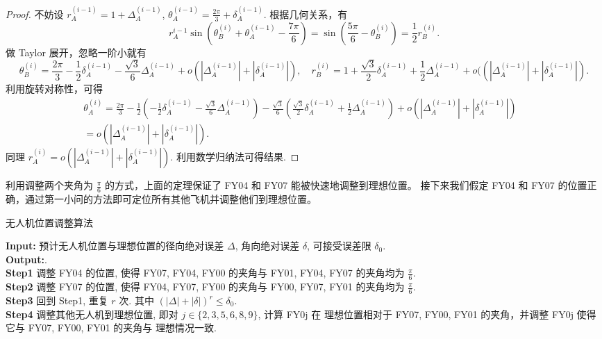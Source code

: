 \documentclass{my_paper}
\begin{document}
\begin{proof}
    不妨设 $r_A^{(i-1)}=1+\Delta_A^{(i-1)}$, $\theta_A^{(i-1)}=\frac{2\pi}{3}+\delta_A^{(i-1)}$. 根据几何关系，有 
    $$
    r_A^{i-1}\sin(\theta_B^{(i)}+\theta_A^{(i-1)}-\frac{7\pi}{6})=\sin(\frac{5\pi}{6}-\theta_{B}^{(i)})=\frac12 r_B^{(i)}.
    $$
    做 Taylor 展开，忽略一阶小就有
    $$
        \theta_{B}^{(i)}= \frac{2\pi}3-\frac{1}{2} \delta_A^{(i-1)}-\frac{\sqrt 3}6 \Delta_A^{(i-1)}+o(|\Delta_A^{(i-1)}|+|\delta_A^{(i-1)}|)
        ,\quad r_{B}^{(i)} = 1 +\frac{\sqrt3}{2} \delta_A^{(i-1)}+\frac12 \Delta_A^{(i-1)}+o((|\Delta_A^{(i-1)}|+|\delta_A^{(i-1)}|).
    $$
    利用旋转对称性，可得
    \begin{equation}
    \begin{aligned}
        \theta_{A}^{(i)}= \frac{2\pi}3-\frac{1}{2} (-\frac{1}{2} \delta_A^{(i-1)}-\frac{\sqrt 3}6 \Delta_A^{(i-1)})
        -\frac{\sqrt 3}6 (\frac{\sqrt3}{2} \delta_A^{(i-1)}+\frac12 \Delta_A^{(i-1)}) +o(|\Delta_A^{(i-1)}|+|\delta_A^{(i-1)}|)
        \\=o(|\Delta_A^{(i-1)}|+|\delta_A^{(i-1)}|).&
    \end{aligned}
    \label{2}
    \end{equation}
    同理 $r_{A}^{(i)}=o(|\Delta_A^{(i-1)}|+|\delta_A^{(i-1)}|).$ 利用数学归纳法可得结果. 
\end{proof}

    利用调整两个夹角为 $\frac\pi6$ 的方式，上面的定理保证了 FY04 和 FY07 能被快速地调整到理想位置。
    接下来我们假定 FY04 和 FY07 的位置正确，通过第一小问的方法即可定位所有其他飞机并调整他们到理想位置。

\begin{algorithm}[t]
    \caption{\small 无人机位置调整算法}
    \textbf{Input:} 预计无人机位置与理想位置的径向绝对误差 $\Delta$, 角向绝对误差 $\delta$, 可接受误差限 $\delta_0$.\\
    \textbf{Output:}. \\
    \textbf{Step1} 调整 FY04 的位置, 使得 FY07, FY04, FY00 的夹角与 FY01, FY04, FY07 的夹角均为 $\frac{\pi}{6}$.\\
    \textbf{Step2} 调整 FY07 的位置, 使得 FY04, FY07, FY00 的夹角与 FY00, FY07, FY01 的夹角均为 $\frac{\pi}{6}$.\\
    \textbf{Step3} 回到 Step1, 重复 $r$ 次. 其中 $(|\Delta|+|\delta|)^r\leq\delta_0$. \\
    \textbf{Step4} 调整其他无人机到理想位置, 即对 $j\in\{2,3,5,6,8,9\}$, 计算 FY0j 在
    理想位置相对于 FY07, FY00, FY01 的夹角，并调整 FY0j 使得它与 FY07, FY00, FY01 的夹角与
    理想情况一致.\\
\end{algorithm}
\end{document}

